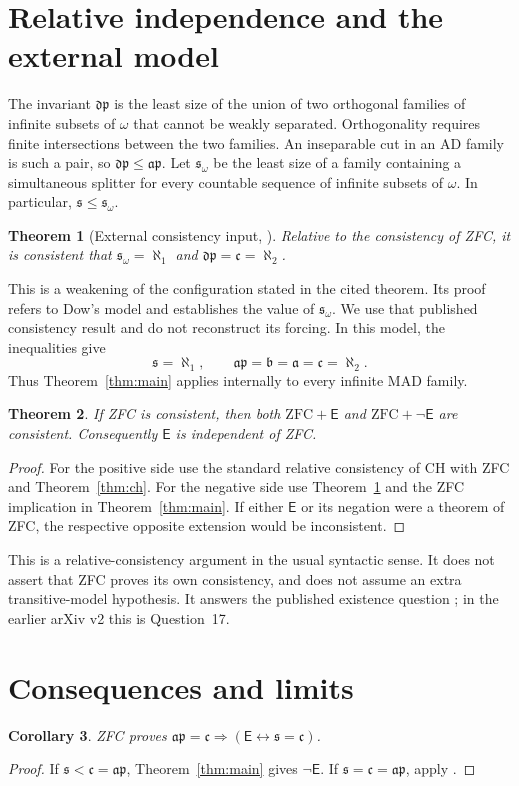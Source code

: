 \documentclass[11pt,letterpaper]{article}
\newtheorem{theorem}{Theorem}[section]
\newtheorem{corollary}[theorem]{Corollary}
\theoremstyle{definition}
\theoremstyle{remark}
\newcommand{\s}{\mathfrak{s}}
\newcommand{\bnum}{\mathfrak{b}}
\newcommand{\anum}{\mathfrak{a}}
\newcommand{\ap}{\mathfrak{ap}}
\newcommand{\dpnum}{\mathfrak{dp}}
\newcommand{\cont}{\mathfrak{c}}
\newcommand{\E}{\mathsf{E}}
\begin{document}
\section{Relative independence and the external model}\label{sec:independence}
The invariant $\dpnum$ is the least size of the union of two orthogonal
families of infinite subsets of $\omega$ that cannot be weakly separated.
Orthogonality requires finite intersections between the two families.
An inseparable cut in an AD family is such a pair, so $\dpnum\leq\ap$.
Let $\s_\omega$ be the least size of a family containing a simultaneous
splitter for every countable sequence of infinite subsets of $\omega$.
In particular, $\s\leq\s_\omega$.

\begin{theorem}[External consistency input, {\cite[Theorem~4(3)]{BMZ}}]\label{thm:bmz}
Relative to the consistency of ZFC, it is consistent that
$\s_\omega=\aleph_1$ and $\dpnum=\cont=\aleph_2$.
\end{theorem}
This is a weakening of the configuration stated in the cited theorem.
Its proof refers to Dow's model and establishes the value of $\s_\omega$.
We use that published consistency result and do not reconstruct its forcing.
In this model, the inequalities give
\[
 \s=\aleph_1,\qquad \ap=\bnum=\anum=\cont=\aleph_2.
\]
Thus Theorem~\ref{thm:main} applies internally to every infinite MAD family.

\begin{theorem}\label{thm:independence}
If ZFC is consistent, then both $\mathrm{ZFC}+\E$ and
$\mathrm{ZFC}+\neg\E$ are consistent. Consequently $\E$ is independent of ZFC.
\end{theorem}
\begin{proof}
For the positive side use the standard relative consistency of CH with
ZFC and Theorem~\ref{thm:ch}. For the negative side use
Theorem~\ref{thm:bmz} and the ZFC implication in Theorem~\ref{thm:main}.
If either $\E$ or its negation were a theorem of ZFC, the respective
opposite extension would be inconsistent.
\end{proof}
This is a relative-consistency argument in the usual syntactic sense.
It does not assert that ZFC proves its own consistency, and does not assume
an extra transitive-model hypothesis. It answers the published existence
question \cite[Question~3.7]{CR}; in the earlier arXiv v2 this is Question~17.

\section{Consequences and limits}
\begin{corollary}\label{cor:section}
ZFC proves $\ap=\cont\Rightarrow(\E\leftrightarrow\s=\cont)$.
\end{corollary}
\begin{proof}
If $\s<\cont=\ap$, Theorem~\ref{thm:main} gives $\neg\E$.
If $\s=\cont=\ap$, apply \cite[Theorem~3.4]{CR}.
\end{proof}
\end{document}
